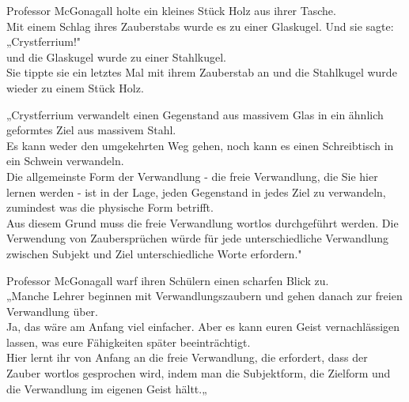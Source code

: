 {Professor McGonagall holte ein kleines Stück Holz aus ihrer Tasche.\\ Mit einem Schlag ihres Zauberstabs wurde es zu einer Glaskugel. Und sie sagte:\\ „Crystferrium!"\\ und die Glaskugel wurde zu einer Stahlkugel.\\ Sie tippte sie ein letztes Mal mit ihrem Zauberstab an und die Stahlkugel wurde wieder zu einem Stück Holz.

„Crystferrium verwandelt einen Gegenstand aus massivem Glas in ein ähnlich geformtes Ziel aus massivem Stahl.\\ Es kann weder den umgekehrten Weg gehen, noch kann es einen Schreibtisch in ein Schwein verwandeln.\\ Die allgemeinste Form der Verwandlung - die freie Verwandlung, die Sie hier lernen werden - ist in der Lage, jeden Gegenstand in jedes Ziel zu verwandeln, zumindest was die physische Form betrifft.\\ Aus diesem Grund muss die freie Verwandlung wortlos durchgeführt werden. Die Verwendung von Zaubersprüchen würde für jede unterschiedliche Verwandlung zwischen Subjekt und Ziel unterschiedliche Worte erfordern."

Professor McGonagall warf ihren Schülern einen scharfen Blick zu.\\ „Manche Lehrer beginnen mit Verwandlungszaubern und gehen danach zur freien Verwandlung über.\\ Ja, das wäre am Anfang viel einfacher. Aber es kann euren Geist vernachlässigen lassen, was eure Fähigkeiten später beeinträchtigt.\\ Hier lernt ihr von Anfang an die freie Verwandlung, die erfordert, dass der Zauber wortlos gesprochen wird, indem man die Subjektform, die Zielform und die Verwandlung im eigenen Geist hältt.„

}
